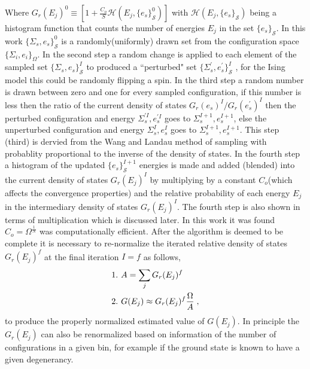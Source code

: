 \documentclass[aps,prl,reprint,superscriptaddress,showkeys]{revtex4-1}
\begin{document}
Where  $G_{r}(E_j)^0 \equiv [1 +  \frac{C_o}{S}\mathcal{H}(E_j,\{e_s\}_{\mathcal{S}}^0)]$ with $\mathcal{H}(E_j,\{e_s\}_{\mathcal{S}})$ being a histogram function that counts the number of energies $E_j$ in the set $\{e_s\}_{\mathcal{S}}$. In this work $\{\Sigma_{s},e_s\}_{\mathcal{S}}^0$  is a randomly(uniformly) drawn set from the configuration space $\{ \Sigma_i, e_i \}_\Omega $. In the second step  a random change is applied to each element of the sampled set $\{\Sigma_{s},e_s\}_{\mathcal{S}}^I$ to produced a ``perturbed" set $ \{\Sigma_{s}^{'},e_s^{'}\}_{\mathcal{S}}^I$ , for the Ising model this could be randomly flipping a spin.  In the third step a random number is drawn between zero and one for every sampled configuration, if this number is less then the ratio of the current density of states $G_{r}(e_s)^{I}/G_{r}(e_s^{'})^{I}$ then the perturbed configuration and energy  $\Sigma_{s}^{'I},e_s^{'I}$  goes to $\Sigma_{s}^{I+1},e_s^{I+1}$,  else the unperturbed configuration and energy $\Sigma_{s}^{I},e_s^I$  goes to $\Sigma_{s}^{I+1},e_s^{I+1}$. This step (third) is dervied from the Wang and Landau method of sampling with probablity proportional to the inverse of the density of states.  In the fourth step a histogram of the updated $\{ e_s \}^{I+1}_{\mathcal{S}}$ energies is made and added (blended) into the current density of states $G_{r}(E_j)^I$   by multiplying  by a constant $C_{o}$(which affects the convergence properties) and the relative probability of each energy $E_j$ in the  intermediary density of states $G_{r}(E_j)^{I}$. The fourth step is also shown in terms of multiplication which is discussed later. In this work it was found  $C_{o}=\Omega^{\frac{1}{N}}$ was computationally efficient. After the algorithm is deemed to be complete it is necessary to re-normalize the iterated relative density of states $G_{r}(E_j)^f$ at the final iteration $I=f$ as follows, 
\begin{equation}
\begin{split}
&1. \hspace{0.125cm} A = \sum_jG_{r}(E_j)^f\\
&2. \hspace{0.125cm} G(E_j)\approx G_{r}(E_j)^f \frac{\Omega}{A} \;,
\end{split}
\label{renormalize}
\end{equation}
to produce the properly normalized estimated value of $G(E_j)$. In principle the $G_{r}(E_j)$ can also be renormalized based on information of the number of configurations in a given bin, for example if the ground state is known to have a given degenerancy.  
\end{document}
